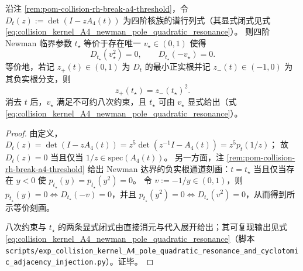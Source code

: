 %
\begin{proposition}[Newman 临界的极点二次共振刻画：\texorpdfstring{$D_t(v^2)=D_t(-v)=0$}{Dt(v^2)=Dt(-v)=0}]\label{prop:pom-a4t-newman-pole-quadratic-resonance}
沿注 \ref{rem:pom-collision-rh-break-a4-threshold}，令
\(
D_t(z):=\det(I-zA_4(t))
\)
为四阶核族的谱行列式（其显式闭式见式 \eqref{eq:collision_kernel_A4_newman_pole_quadratic_resonance}）。
则四阶 Newman 临界参数 \(t_\star\) 等价于存在唯一 \(v_\star\in(0,1)\) 使得
\[
D_{t_\star}(v_\star^2)=0,\qquad D_{t_\star}(-v_\star)=0.
\]
等价地，若记 \(z_+(t)\in(0,1)\) 为 \(D_t\) 的最小正实根并记 \(z_-(t)\in(-1,0)\) 为其负实根分支，则
\[
z_+(t_\star)=z_-(t_\star)^2.
\]
消去 \(t\) 后，\(v_\star\) 满足不可约八次约束，且 \(t_\star\) 可由 \(v_\star\) 显式给出（式 \eqref{eq:collision_kernel_A4_newman_pole_quadratic_resonance}）。
\end{proposition}
\begin{proof}
由定义，
\(
D_t(z)=\det(I-zA_4(t))=z^5\det(z^{-1}I-A_4(t))=z^5p_t(1/z)
\)；
故 \(D_t(z)=0\) 当且仅当 \(1/z\in\mathrm{spec}(A_4(t))\)。
另一方面，注 \ref{rem:pom-collision-rh-break-a4-threshold} 给出 Newman 达界的负实根通道刻画：\(t=t_\star\) 当且仅当存在 \(y<0\) 使 \(p_{t_\star}(y)=p_{t_\star}(y^2)=0\)。
令 \(v:=-1/y\in(0,1)\)，则 \(p_{t_\star}(y)=0\iff D_{t_\star}(-v)=0\)，并且 \(p_{t_\star}(y^2)=0\iff D_{t_\star}(v^2)=0\)，从而得到所示等价刻画。
\par
八次约束与 \(t_\star\) 的两条显式闭式由直接消元与代入展开给出；其可复现输出见式 \eqref{eq:collision_kernel_A4_newman_pole_quadratic_resonance}（脚本 \texttt{scripts/exp\_collision\_kernel\_A4\_pole\_quadratic\_resonance\_and\_cyclotomic\_adjacency\_injection.py}）。证毕。
\end{proof}



